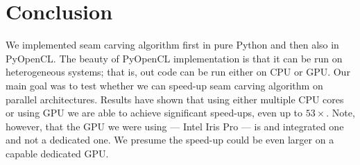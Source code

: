 \documentclass[a4paper,11pt]{article}
\begin{document}
\begin{figure}[h!]
\begin{minipage}[b]{0.48\linewidth}
\end{minipage}
\hfill
\begin{minipage}[b]{0.48\linewidth}

\centering
\setlength\fboxsep{5pt}
\setlength\fboxrule{0pt}

\end{minipage}
\label{fig:scenario}
\end{figure}


\section{Conclusion}
We implemented seam carving algorithm first in pure Python and then also in PyOpenCL.
The beauty of PyOpenCL implementation is that it can be run on heterogeneous systems; that is, out code can be run either on CPU or GPU.
Our main goal was to test whether we can speed-up seam carving algorithm on parallel architectures.
Results have shown that using either multiple CPU cores or using GPU we are able to achieve significant speed-ups, even up to $53\times$.
Note, however, that the GPU we were using — Intel Iris Pro — is and integrated one and not a dedicated one.
We presume the speed-up could be even larger on a capable dedicated GPU.
\end{document}

